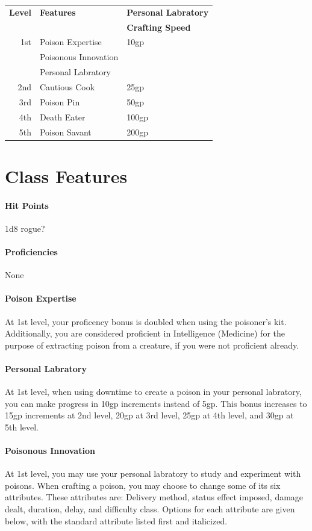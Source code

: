 \documentclass{report}
\begin{document}
\begin{tabular}{rll}
{\bf Level} & {\bf Features} & {\bf Personal Labratory} \\&&{\bf Crafting Speed} \\
1st & Poison Expertise            & 10gp \\
    & Poisonous Innovation  &\\
    & Personal Labratory    &\\
2nd & Cautious Cook           & 25gp  \\
3rd & Poison Pin           & 50gp     \\
4th & Death Eater           & 100gp   \\
5th & Poison Savant           & 200gp \\
\end{tabular}

\section*{Class Features}

\paragraph*{Hit Points}
1d8 rogue?

\paragraph*{Proficiencies}
None


\paragraph*{Poison Expertise}
  At 1st level, your proficency bonus is doubled when using the poisoner's kit.
  Additionally, you are considered proficient in Intelligence (Medicine) for the purpose of extracting poison from a creature, if you were not proficient already.

\paragraph*{Personal Labratory}
At 1st level, when using downtime to create a poison in your personal labratory, you can make progress in 10gp increments instead of 5gp.
This bonus increases to 15gp increments at 2nd level, 20gp at 3rd level, 25gp at 4th level, and 30gp at 5th level.

\paragraph*{Poisonous Innovation}
  At 1st level, you may use your personal labratory to study and experiment with poisons.
  When crafting a poison, you may choose to change some of its six attributes.
  These attributes are: Delivery method, status effect imposed, damage dealt, duration, delay, and difficulty class.
  Options for each attribute are given below, with the standard attribute listed first and italicized.
\end{document}
